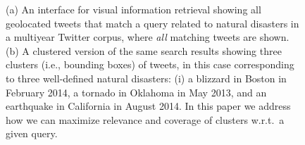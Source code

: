 \begin{figure}[t]
\begin{centering}
\hspace{0.05cm}
\par\end{centering}
\caption{(a) An interface for visual information retrieval showing all geolocated tweets that match a query related to natural disasters in a multiyear Twitter corpus, where \emph{all} matching tweets are shown.
(b) A clustered version of the same search results showing three clusters (i.e., bounding boxes) of tweets, in this case corresponding to three well-defined natural disasters: (i) a blizzard in Boston in February 2014, a tornado in Oklahoma in May 2013, and an earthquake in California in August 2014.  In this paper we address how we can maximize relevance and coverage of clusters w.r.t.\ a given query.}
\label{Fig:UseCase}
\end{figure}

